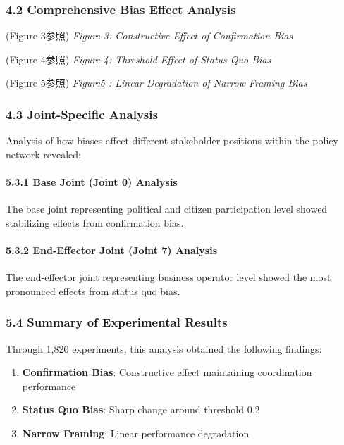 \subsubsection{4.2 Comprehensive Bias Effect Analysis}\label{comprehensive-bias-effect-analysis}

(Figure 3参照) \emph{Figure 3: Constructive Effect of Confirmation Bias}

(Figure 4参照) \emph{Figure 4: Threshold Effect of Status Quo Bias}

(Figure 5参照) \emph{Figure5 : Linear Degradation of Narrow Framing Bias}

\subsubsection{4.3 Joint-Specific Analysis}\label{joint-specific-analysis}

Analysis of how biases affect different stakeholder positions within the policy network revealed:

\paragraph{5.3.1 Base Joint (Joint 0) Analysis}\label{base-joint-joint-0-analysis}

The base joint representing political and citizen participation level showed stabilizing effects from confirmation bias.

\paragraph{5.3.2 End-Effector Joint (Joint 7) Analysis}\label{end-effector-joint-joint-7-analysis}

The end-effector joint representing business operator level showed the most pronounced effects from status quo bias.

\subsubsection{5.4 Summary of Experimental Results}\label{summary-of-experimental-results}

Through 1,820 experiments, this analysis obtained the following findings:

\begin{enumerate}
\def\labelenumi{\arabic{enumi}.}
\tightlist
\item
  \textbf{Confirmation Bias}: Constructive effect maintaining coordination performance
\item
  \textbf{Status Quo Bias}: Sharp change around threshold 0.2
\item
  \textbf{Narrow Framing}: Linear performance degradation
\end{enumerate}

